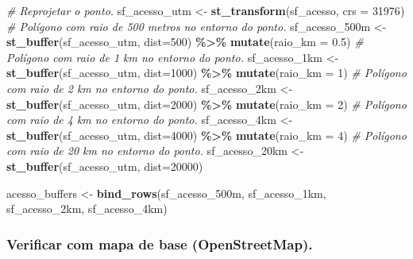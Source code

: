 \documentclass[
]{article}
\newenvironment{Shaded}{\begin{snugshade}}{\end{snugshade}}
\newcommand{\AttributeTok}[1]{\textcolor[rgb]{0.13,0.29,0.53}{#1}}
\newcommand{\CommentTok}[1]{\textcolor[rgb]{0.56,0.35,0.01}{\textit{#1}}}
\newcommand{\DecValTok}[1]{\textcolor[rgb]{0.00,0.00,0.81}{#1}}
\newcommand{\FloatTok}[1]{\textcolor[rgb]{0.00,0.00,0.81}{#1}}
\newcommand{\FunctionTok}[1]{\textcolor[rgb]{0.13,0.29,0.53}{\textbf{#1}}}
\newcommand{\NormalTok}[1]{#1}
\newcommand{\OtherTok}[1]{\textcolor[rgb]{0.56,0.35,0.01}{#1}}
\newcommand{\SpecialCharTok}[1]{\textcolor[rgb]{0.81,0.36,0.00}{\textbf{#1}}}
\begin{document}
\begin{Shaded}
\begin{Highlighting}[]
\CommentTok{\# Reprojetar o ponto.}
\NormalTok{sf\_acesso\_utm }\OtherTok{\textless{}{-}} \FunctionTok{st\_transform}\NormalTok{(sf\_acesso, }\AttributeTok{crs =} \DecValTok{31976}\NormalTok{)}
\CommentTok{\# Polígono com raio de 500 metros no entorno do ponto.}
\NormalTok{sf\_acesso\_500m }\OtherTok{\textless{}{-}} \FunctionTok{st\_buffer}\NormalTok{(sf\_acesso\_utm, }\AttributeTok{dist=}\DecValTok{500}\NormalTok{) }\SpecialCharTok{\%\textgreater{}\%} 
  \FunctionTok{mutate}\NormalTok{(}\AttributeTok{raio\_km =} \FloatTok{0.5}\NormalTok{)}
\CommentTok{\# Polígono com raio de 1 km no entorno do ponto.}
\NormalTok{sf\_acesso\_1km }\OtherTok{\textless{}{-}} \FunctionTok{st\_buffer}\NormalTok{(sf\_acesso\_utm, }\AttributeTok{dist=}\DecValTok{1000}\NormalTok{) }\SpecialCharTok{\%\textgreater{}\%} 
  \FunctionTok{mutate}\NormalTok{(}\AttributeTok{raio\_km =} \DecValTok{1}\NormalTok{)}
\CommentTok{\# Polígono com raio de 2 km no entorno do ponto.}
\NormalTok{sf\_acesso\_2km }\OtherTok{\textless{}{-}} \FunctionTok{st\_buffer}\NormalTok{(sf\_acesso\_utm, }\AttributeTok{dist=}\DecValTok{2000}\NormalTok{) }\SpecialCharTok{\%\textgreater{}\%} 
  \FunctionTok{mutate}\NormalTok{(}\AttributeTok{raio\_km =} \DecValTok{2}\NormalTok{)}
\CommentTok{\# Polígono com raio de 4 km no entorno do ponto.}
\NormalTok{sf\_acesso\_4km }\OtherTok{\textless{}{-}} \FunctionTok{st\_buffer}\NormalTok{(sf\_acesso\_utm, }\AttributeTok{dist=}\DecValTok{4000}\NormalTok{) }\SpecialCharTok{\%\textgreater{}\%} 
  \FunctionTok{mutate}\NormalTok{(}\AttributeTok{raio\_km =} \DecValTok{4}\NormalTok{)}
\CommentTok{\# Polígono com raio de 20 km no entorno do ponto.}
\NormalTok{sf\_acesso\_20km }\OtherTok{\textless{}{-}} \FunctionTok{st\_buffer}\NormalTok{(sf\_acesso\_utm, }\AttributeTok{dist=}\DecValTok{20000}\NormalTok{)}

\NormalTok{acesso\_buffers }\OtherTok{\textless{}{-}} \FunctionTok{bind\_rows}\NormalTok{(sf\_acesso\_500m, sf\_acesso\_1km, }
\NormalTok{                            sf\_acesso\_2km, sf\_acesso\_4km)}
\end{Highlighting}
\end{Shaded}

\hypertarget{verificar-com-mapa-de-base-openstreetmap.}{%
\subsubsection{Verificar com mapa de base (OpenStreetMap).}\label{verificar-com-mapa-de-base-openstreetmap.}}
\end{document}
